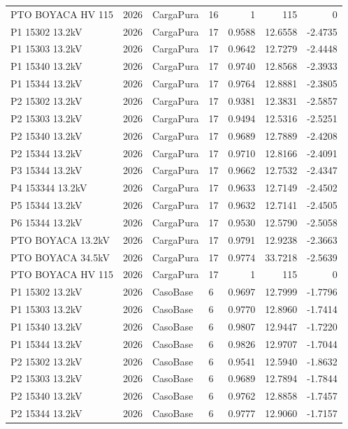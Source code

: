 \documentclass[11pt,a4paper]{article}
\begin{document}
\begin{longtable}{llllrrr}
PTO BOYACA HV 115 & 2026 & CargaPura & 16 & 1 & 115 & 0 \\
P1 15302 13.2kV & 2026 & CargaPura & 17 & 0.9588 & 12.6558 & -2.4735 \\
P1 15303 13.2kV & 2026 & CargaPura & 17 & 0.9642 & 12.7279 & -2.4448 \\
P1 15340 13.2kV & 2026 & CargaPura & 17 & 0.9740 & 12.8568 & -2.3933 \\
P1 15344 13.2kV & 2026 & CargaPura & 17 & 0.9764 & 12.8881 & -2.3805 \\
P2 15302 13.2kV & 2026 & CargaPura & 17 & 0.9381 & 12.3831 & -2.5857 \\
P2 15303 13.2kV & 2026 & CargaPura & 17 & 0.9494 & 12.5316 & -2.5251 \\
P2 15340 13.2kV & 2026 & CargaPura & 17 & 0.9689 & 12.7889 & -2.4208 \\
P2 15344 13.2kV & 2026 & CargaPura & 17 & 0.9710 & 12.8166 & -2.4091 \\
P3 15344 13.2kV & 2026 & CargaPura & 17 & 0.9662 & 12.7532 & -2.4347 \\
P4 153344 13.2kV & 2026 & CargaPura & 17 & 0.9633 & 12.7149 & -2.4502 \\
P5 15344 13.2kV & 2026 & CargaPura & 17 & 0.9632 & 12.7141 & -2.4505 \\
P6 15344 13.2kV & 2026 & CargaPura & 17 & 0.9530 & 12.5790 & -2.5058 \\
PTO BOYACA 13.2kV & 2026 & CargaPura & 17 & 0.9791 & 12.9238 & -2.3663 \\
PTO BOYACA 34.5kV & 2026 & CargaPura & 17 & 0.9774 & 33.7218 & -2.5639 \\
PTO BOYACA HV 115 & 2026 & CargaPura & 17 & 1 & 115 & 0 \\
P1 15302 13.2kV & 2026 & CasoBase & 6 & 0.9697 & 12.7999 & -1.7796 \\
P1 15303 13.2kV & 2026 & CasoBase & 6 & 0.9770 & 12.8960 & -1.7414 \\
P1 15340 13.2kV & 2026 & CasoBase & 6 & 0.9807 & 12.9447 & -1.7220 \\
P1 15344 13.2kV & 2026 & CasoBase & 6 & 0.9826 & 12.9707 & -1.7044 \\
P2 15302 13.2kV & 2026 & CasoBase & 6 & 0.9541 & 12.5940 & -1.8632 \\
P2 15303 13.2kV & 2026 & CasoBase & 6 & 0.9689 & 12.7894 & -1.7844 \\
P2 15340 13.2kV & 2026 & CasoBase & 6 & 0.9762 & 12.8858 & -1.7457 \\
P2 15344 13.2kV & 2026 & CasoBase & 6 & 0.9777 & 12.9060 & -1.7157 \\

\end{longtable}
\end{document}
